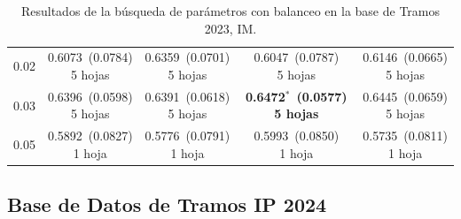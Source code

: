 \documentclass[twoside,a4paper,12pt,onecolumn,openany]{book}
\begin{document}
\begin{table}[H]
\begin{tabular}{r|cccc}
0.02 & \shortstack{0.6073~(0.0784)\\ 5 hojas} & \shortstack{0.6359~(0.0701)\\ 5 hojas} & \shortstack{0.6047~(0.0787)\\ 5 hojas} & \shortstack{0.6146~(0.0665)\\ 5 hojas} \\[4pt]
0.03 & \shortstack{0.6396~(0.0598)\\ 5 hojas} & \shortstack{0.6391~(0.0618)\\ 5 hojas} & \shortstack{\textbf{0.6472}$^{*}$~\textbf{(0.0577)}\\ \textbf{5 hojas}} & \shortstack{0.6445~(0.0659)\\ 5 hojas} \\[4pt]
0.05 & \shortstack{0.5892~(0.0827)\\ 1 hoja} & \shortstack{0.5776~(0.0791)\\ 1 hoja} & \shortstack{0.5993~(0.0850)\\ 1 hoja} & \shortstack{0.5735~(0.0811)\\ 1 hoja} \\[4pt]
\bottomrule
\end{tabular}
\caption{Resultados de la búsqueda de parámetros con balanceo en la base de Tramos 2023, IM.}
\label{tab:busqueda_im_2023}
\end{table}
 
\vspace{0.3cm}
 
\subsection*{Base de Datos de Tramos IP 2024}
 
\end{document}
